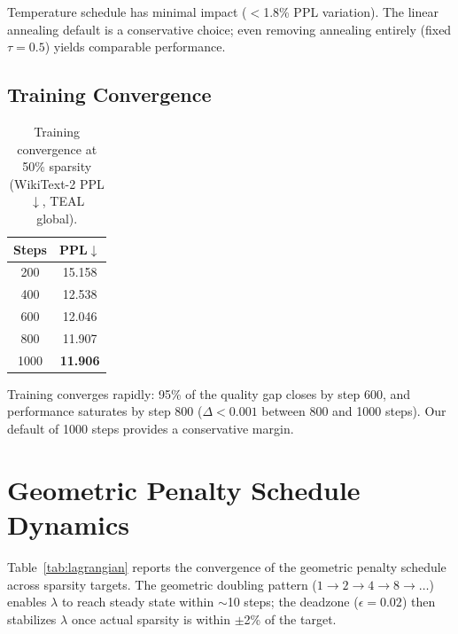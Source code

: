 Temperature schedule has minimal impact ($<$1.8\% PPL variation).
The linear annealing default is a conservative choice; even removing annealing entirely (fixed $\tau{=}0.5$) yields comparable performance.

\subsection{Training Convergence}
\label{app:training_convergence}

\begin{table}[h]
\centering
\caption{Training convergence at 50\% sparsity (WikiText-2 PPL$\downarrow$, TEAL global).}
\label{tab:training_convergence}
\small
\begin{tabular}{cc}
\toprule
Steps & PPL$\downarrow$ \\
\midrule
200 & 15.158 \\
400 & 12.538 \\
600 & 12.046 \\
800 & 11.907 \\
1000 & \textbf{11.906} \\
\bottomrule
\end{tabular}
\end{table}

Training converges rapidly: 95\% of the quality gap closes by step 600, and performance saturates by step 800 ($\Delta < 0.001$ between 800 and 1000 steps).
Our default of 1000 steps provides a conservative margin.


\section{Geometric Penalty Schedule Dynamics}
\label{app:lagrangian}

Table~\ref{tab:lagrangian} reports the convergence of the geometric penalty schedule across sparsity targets.
The geometric doubling pattern ($1 \to 2 \to 4 \to 8 \to \ldots$) enables $\lambda$ to reach steady state within $\sim$10 steps; the deadzone ($\epsilon = 0.02$) then stabilizes $\lambda$ once actual sparsity is within $\pm$2\% of the target.

\begin{table}[h]
\centering
\caption{Geometric penalty schedule convergence across sparsity targets (margin $\epsilon=0.02$, 1000 training steps). Deviation is $|$actual $-$ target$|$ / target.}
\label{tab:lagrangian}
\end{table}

